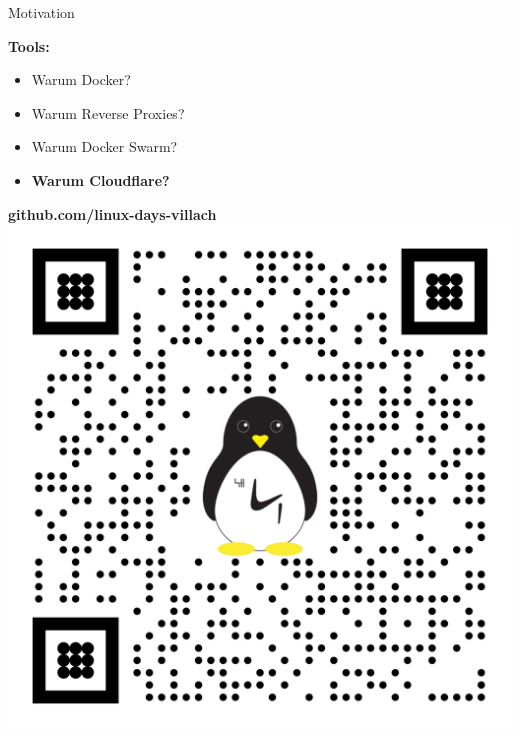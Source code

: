 \documentclass[10pt, unknownkeysallowed]{beamer}
\begin{document}
\begin{frame}{Motivation}
\begin{minipage}{.45\textwidth}
    \vspace*{5px}
    \textbf{Tools:}
	\begin{itemize}
	    \item Warum Docker?
		\item Warum Reverse Proxies?
		\item Warum Docker Swarm?
		\item \textbf{Warum Cloudflare?}
	\end{itemize}
	\vspace*{10px}
\end{minipage}
\hfill\vline\hfill
\begin{minipage}{.45\textwidth}
    \vspace*{15px}
    \textbf{github.com/linux-days-villach}
    \includegraphics[width=\linewidth,center]{qr-code.png}
\end{minipage}
\end{frame}
\end{document}
